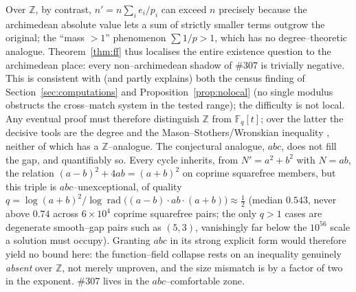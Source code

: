 \documentclass[11pt]{article}
\theoremstyle{definition}
\begin{document}
Over $\mathbb{Z}$, by contrast, $n'=n\sum_i e_i/p_i$ can exceed $n$ precisely because the archimedean
absolute value lets a sum of strictly smaller terms outgrow the original; the ``mass $>1$''
phenomenon $\sum 1/p>1$, which has no degree--theoretic analogue. Theorem~\ref{thm:ff} thus localises
the entire existence question to the archimedean place: every non--archimedean shadow of \#307 is
trivially negative. This is consistent with (and partly explains) both the census finding of
Section~\ref{sec:computations} and Proposition~\ref{prop:nolocal} (no single modulus obstructs the
cross--match system in the tested range); the difficulty is not local. Any eventual proof must therefore distinguish $\mathbb{Z}$ from $\mathbb{F}_q[t]$; over the
latter the decisive tools are the degree and the Mason--Stothers/Wronskian inequality
\cite{Stothers}, neither of which has a $\mathbb{Z}$--analogue. The conjectural analogue, $abc$,
does not fill the gap, and quantifiably so. Every cycle inherits, from $N'=a^2+b^2$ with $N=ab$, the
relation $(a-b)^2+4ab=(a+b)^2$ on coprime squarefree members, but this triple is $abc$--unexceptional,
of quality $q=\log(a+b)^2/\log\operatorname{rad}\!\bigl((a-b)\cdot ab\cdot(a+b)\bigr)\approx\tfrac12$
(median $0.543$, never above $0.74$ across $6\times10^4$ coprime squarefree pairs; the only $q>1$ cases
are degenerate smooth--gap pairs such as $(5,3)$, vanishingly far below the $10^{56}$ scale a solution
must occupy). Granting $abc$ in its strong explicit form would therefore yield no bound here: the
function--field collapse rests on an inequality genuinely \emph{absent} over $\mathbb{Z}$, not merely
unproven, and the size mismatch is by a factor of two in the exponent. \#307 lives in the
$abc$--comfortable zone.
\end{document}
